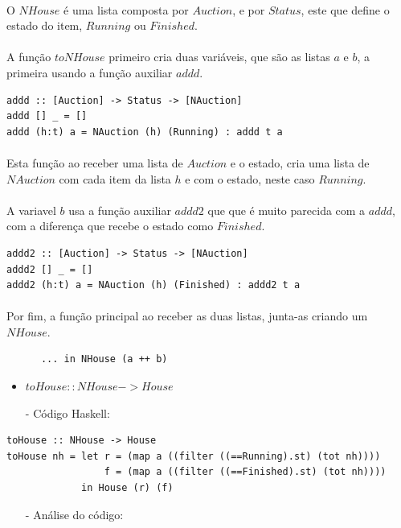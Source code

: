 \documentclass[a4paper]{article}
\begin{document}
\begin{enumerate}
\paragraph{}O $NHouse$ é uma lista composta por $Auction$, e por $Status$, este que define o estado do item, $Running$ ou $Finished$.
\paragraph{}A função $toNHouse$ primeiro cria duas variáveis, que são as listas $a$ e $b$, a primeira usando a função auxiliar $addd$.
\begin{verbatim}
addd :: [Auction] -> Status -> [NAuction]
addd [] _ = []
addd (h:t) a = NAuction (h) (Running) : addd t a
\end{verbatim}
\paragraph{}Esta função ao receber uma lista de $Auction$ e o estado, cria uma lista de $NAuction$ com cada item da lista $h$ e com o estado, neste caso $Running$.
\paragraph{}A variavel $b$ usa a função auxiliar $addd2$ que que é muito parecida com a $addd$, com a diferença que recebe o estado como $Finished$.
\begin{verbatim}
addd2 :: [Auction] -> Status -> [NAuction]
addd2 [] _ = []
addd2 (h:t) a = NAuction (h) (Finished) : addd2 t a
\end{verbatim}
\paragraph{}Por fim, a função principal ao receber as duas listas, junta-as criando um $NHouse$.
\begin{verbatim}
      ... in NHouse (a ++ b)
\end{verbatim}
\begin{itemize}
\item $toHouse :: NHouse -> House$
\item[-]{Código Haskell:}
\end{itemize}
\begin{verbatim}
toHouse :: NHouse -> House
toHouse nh = let r = (map a ((filter ((==Running).st) (tot nh))))
                 f = (map a ((filter ((==Finished).st) (tot nh))))
             in House (r) (f)
\end{verbatim}
\begin{itemize}
\item[-]{Análise do código:}
\end{itemize}

\end{enumerate}
\end{document}
